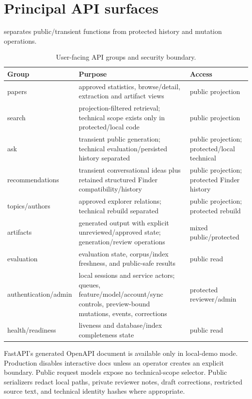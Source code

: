 \section{Principal API surfaces}

 separates public/transient functions from protected history and mutation operations.

\begin{table}[htbp]
\centering
\caption{User-facing API groups and security boundary.}
\label{tab:api-summary}
\begin{tabularx}{\textwidth}{P{36mm}Y P{30mm}}
\toprule
Group & Purpose & Access \\
\midrule
papers & approved statistics, browse/detail, extraction and artifact views & public projection \\
search & projection-filtered retrieval; technical scope exists only in protected/local code & public projection \\
ask & transient public generation; technical evaluation/persisted history separated & public projection; protected/local technical \\
recommendations & transient conversational ideas plus retained structured Finder compatibility/history & public projection; protected Finder history \\
topics/authors & approved explorer relations; technical rebuild separated & public projection; protected rebuild \\
artifacts & generated output with explicit unreviewed/approved state; generation/review operations & mixed public/protected \\
evaluation & evaluation state, corpus/index freshness, and public-safe results & public read \\
authentication/admin & local sessions and service actors; queues, feature/model/account/sync controls, preview-bound mutations, events, corrections & protected reviewer/admin \\
health/readiness & liveness and database/index completeness state & public read \\
\bottomrule
\end{tabularx}
\end{table}

FastAPI's generated OpenAPI document is available only in local-demo mode. Production disables interactive docs unless an operator creates an explicit boundary. Public request models expose no technical-scope selector. Public serializers redact local paths, private reviewer notes, draft corrections, restricted source text, and technical identity hashes where appropriate.


